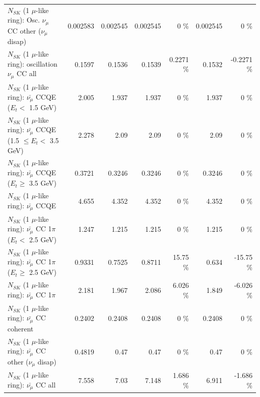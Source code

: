 \begin{table}
\begin{tabular}{| l | r | r | r  r | r  r |}
         $N_{SK}$ (1 $\mu$-like ring): Osc. $\nu_\mu$ CC other ($\nu_\mu$ disap) &        0.002583 &        0.002545 &        0.002545 &        0 \%  &        0.002545 &        0 \%  \\ 
                      $N_{SK}$ (1 $\mu$-like ring): oscillation $\nu_\mu$ CC all &          0.1597 &          0.1536 &          0.1539 &   0.2271 \%  &          0.1532 &  -0.2271 \%  \\ 
\hline
\hline
          $N_{SK}$ (1 $\mu$-like ring): $\bar{\nu_\mu}$ CCQE ($E_{t} <$ 1.5 GeV) &           2.005 &           1.937 &           1.937 &        0 \%  &           1.937 &        0 \%  \\ 
 $N_{SK}$ (1 $\mu$-like ring): $\bar{\nu_\mu}$ CCQE (1.5 $\leq E_{t} <$ 3.5 GeV) &           2.278 &            2.09 &            2.09 &        0 \%  &            2.09 &        0 \%  \\ 
       $N_{SK}$ (1 $\mu$-like ring): $\bar{\nu_\mu}$ CCQE ($E_{t} \geq$ 3.5 GeV) &          0.3721 &          0.3246 &          0.3246 &        0 \%  &          0.3246 &        0 \%  \\ 
\hline
                              $N_{SK}$ (1 $\mu$-like ring): $\bar{\nu_\mu}$ CCQE &           4.655 &           4.352 &           4.352 &        0 \%  &           4.352 &        0 \%  \\ 
\hline
     $N_{SK}$ (1 $\mu$-like ring): $\bar{\nu_\mu}$ CC 1$\pi$ ($E_{t} <$ 2.5 GeV) &           1.247 &           1.215 &           1.215 &        0 \%  &           1.215 &        0 \%  \\ 
  $N_{SK}$ (1 $\mu$-like ring): $\bar{\nu_\mu}$ CC 1$\pi$ ($E_{t} \geq$ 2.5 GeV) &          0.9331 &          0.7525 &          0.8711 &    15.75 \%  &           0.634 &   -15.75 \%  \\ 
\hline
                         $N_{SK}$ (1 $\mu$-like ring): $\bar{\nu_\mu}$ CC 1$\pi$ &           2.181 &           1.967 &           2.086 &    6.026 \%  &           1.849 &   -6.026 \%  \\ 
                       $N_{SK}$ (1 $\mu$-like ring): $\bar{\nu_\mu}$ CC coherent &          0.2402 &          0.2408 &          0.2408 &        0 \%  &          0.2408 &        0 \%  \\ 
        $N_{SK}$ (1 $\mu$-like ring): $\bar{\nu_\mu}$ CC other ($\nu_\mu$ disap) &          0.4819 &            0.47 &            0.47 &        0 \%  &            0.47 &        0 \%  \\ 
                          $N_{SK}$ (1 $\mu$-like ring): $\bar{\nu_{\mu}}$ CC all &           7.558 &            7.03 &           7.148 &    1.686 \%  &           6.911 &   -1.686 \%  \\ 

\end{tabular}
\end{table}
